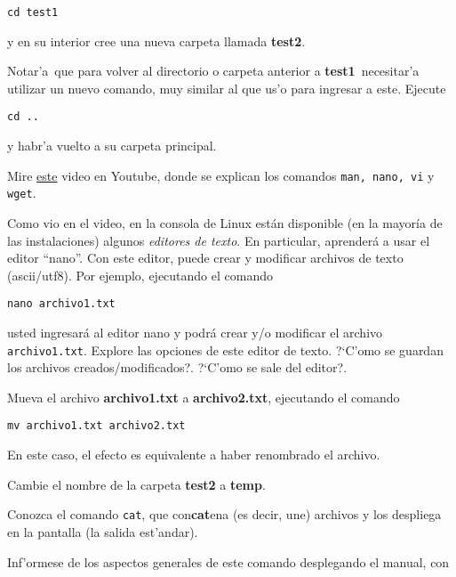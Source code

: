 \documentclass[11pt]{exam}
\begin{document}
\begin{questions}
\begin{parts}
\begin{verbatim}
cd test1
\end{verbatim}

y en su interior cree una nueva carpeta llamada \textbf{test2}.

\item Notar'a que para volver al directorio o carpeta anterior a \textbf{test1} necesitar'a utilizar un nuevo comando, muy similar al que us'o para ingresar a este. Ejecute

\begin{verbatim}
cd ..
\end{verbatim}

y habr'a vuelto a su carpeta principal.

\item Mire \href{https://www.youtube.com/watch?v=4Cz8E71PYd4}{este} video en Youtube, donde se explican los comandos \texttt{man, nano, vi} y \texttt{wget}.

\item Como vio en el video, en la consola de Linux están disponible (en la mayoría de las instalaciones) algunos \textit{editores de texto}. En particular, aprenderá a usar el editor ``nano''. Con este editor, puede crear y modificar archivos de texto (ascii/utf8). Por ejemplo, ejecutando el comando 

\begin{verbatim}
nano archivo1.txt
\end{verbatim}

usted ingresará al editor nano y podrá crear y/o modificar el archivo \texttt{archivo1.txt}.
 Explore las opciones de este editor de texto. ?`C'omo se guardan los archivos creados/modi\-fi\-ca\-dos?. ?`C'omo se sale del editor?.

\item Mueva el archivo \textbf{archivo1.txt} a \textbf{archivo2.txt}, ejecutando el comando

\begin{verbatim}
mv archivo1.txt archivo2.txt
\end{verbatim}

En este caso, el efecto es equivalente a haber renombrado el archivo.

\item Cambie el nombre de la carpeta \textbf{test2} a \textbf{temp}.

\end{parts}

\item Conozca el comando \texttt{cat}, que con\textbf{cat}ena (es decir, une) archivos y los despliega en la pantalla (la salida est'andar).
\begin{parts}
\item  Inf'ormese de los aspectos generales de este comando desplegando el manual, con 


\end{parts}
\end{questions}
\end{document}
